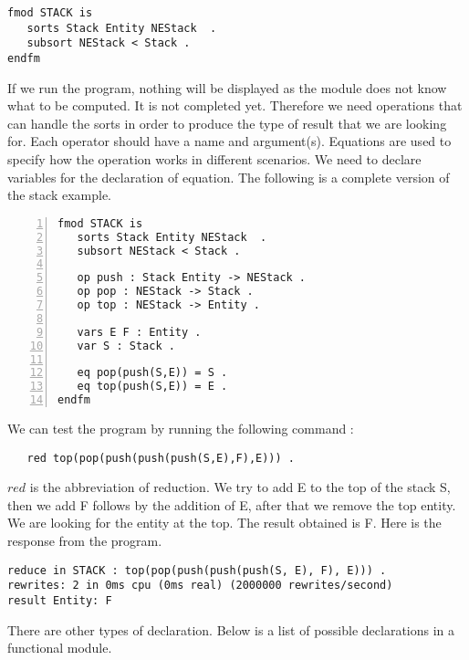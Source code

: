 \documentclass[a4paper,11pt]{report}
\begin{document}
\begin{verbatim}
fmod STACK is
   sorts Stack Entity NEStack  .
   subsort NEStack < Stack .
endfm
\end{verbatim}
If we run the program, nothing will be displayed as the module does not know what to be computed. It is not completed yet. Therefore we need operations that can handle the sorts in order to produce the type of result that we are looking for. Each operator should have a name and argument(s). Equations are used to specify how the operation works in different scenarios. We need to declare variables for the declaration of equation. The following is a complete version of the stack example.
\newpage 
\begin{lstlisting}[numbers=left, frame=lines, xleftmargin=5.0ex]
fmod STACK is
   sorts Stack Entity NEStack  .
   subsort NEStack < Stack .

   op push : Stack Entity -> NEStack .
   op pop : NEStack -> Stack .
   op top : NEStack -> Entity .

   vars E F : Entity .
   var S : Stack .

   eq pop(push(S,E)) = S . 
   eq top(push(S,E)) = E .   
endfm
\end{lstlisting}
We can test the program by running the following command :
\begin{verbatim}
   red top(pop(push(push(push(S,E),F),E))) . \end{verbatim}
$red $ is the abbreviation of reduction. We try to add E to the top of the stack S, then we add F follows by the addition of E, after that we remove the top entity. We are looking for the entity at the top. The result obtained is F. Here is the response from the program.
\newline 
\begin{lstlisting}[frame=single,linewidth=13.4cm]
reduce in STACK : top(pop(push(push(push(S, E), F), E))) .
rewrites: 2 in 0ms cpu (0ms real) (2000000 rewrites/second)
result Entity: F 
\end{lstlisting}
\vspace{0.1cm}
There are other types of declaration. Below is a list of possible declarations in a functional module.
\end{document}
